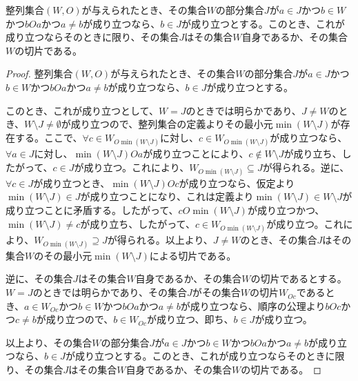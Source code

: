 \documentclass[dvipdfmx]{jsarticle}
\begin{document}
\begin{thm}\label{1.3.2.11}
整列集合$(W,O)$が与えられたとき、その集合$W$の部分集合$J$が$a \in J$かつ$b \in W$かつ$bOa$かつ$a \neq b$が成り立つなら、$b \in J$が成り立つとする。このとき、これが成り立つならそのときに限り、その集合$J$はその集合$W$自身であるか、その集合$W$の切片である。
\end{thm}
\begin{proof}
整列集合$(W,O)$が与えられたとき、その集合$W$の部分集合$J$が$a \in J$かつ$b \in W$かつ$bOa$かつ$a \neq b$が成り立つなら、$b \in J$が成り立つとする。\par
このとき、これが成り立つとして、$W = J$のときでは明らかであり、$J \neq W$のとき、$W \setminus J \neq \emptyset $が成り立つので、整列集合の定義よりその最小元$\min(W \setminus J)$が存在する。ここで、$\forall c \in W_{O\min(W \setminus J)}$に対し、$c \in W_{O\min(W \setminus J)}$が成り立つなら、$\forall a \in J$に対し、$\min(W \setminus J)Oa$が成り立つことにより、$c \notin W \setminus J$が成り立ち、したがって、$c \in J$が成り立つ。これにより、$W_{O\min(W \setminus J)} \subseteq J$が得られる。逆に、$\forall c \in J$が成り立つとき、$\min(W \setminus J)Oc$が成り立つなら、仮定より$\min(W \setminus J) \in J$が成り立つことになり、これは定義より$\min(W \setminus J) \in W \setminus J$が成り立つことに矛盾する。したがって、$cO\min(W \setminus J)$が成り立つかつ、$\min(W \setminus J) \neq c$が成り立ち、したがって、$c \in W_{O\min(W \setminus J)}$が成り立つ。これにより、$W_{O\min(W \setminus J)} \supseteq J$が得られる。以上より、$J \neq W$のとき、その集合$J$はその集合$W$のその最小元$\min(W \setminus J)$による切片である。\par
逆に、その集合$J$はその集合$W$自身であるか、その集合$W$の切片であるとする。$W = J$のときでは明らかであり、その集合$J$がその集合$W$の切片$W_{Oc}$であるとき、$a \in W_{Oc}$かつ$b \in W$かつ$bOa$かつ$a \neq b$が成り立つなら、順序の公理より$bOc$かつ$c \neq b$が成り立つので、$b \in W_{Oc}$が成り立つ、即ち、$b \in J$が成り立つ。\par
以上より、その集合$W$の部分集合$J$が$a \in J$かつ$b \in W$かつ$bOa$かつ$a \neq b$が成り立つなら、$b \in J$が成り立つとする。このとき、これが成り立つならそのときに限り、その集合$J$はその集合$W$自身であるか、その集合$W$の切片である。
\end{proof}
\end{document}
